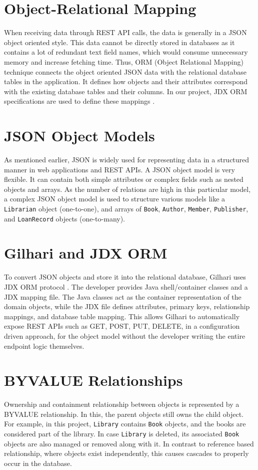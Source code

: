 \documentclass{book}
\begin{document}
\section{Object-Relational Mapping}
When receiving data through REST API calls, the data is generally in a JSON object oriented style. This data cannot be directly stored in databases as it contains a lot of redundant text field names, which would consume unnecessary memory and increase fetching time. Thus, ORM (Object Relational Mapping) technique connects the object oriented JSON data with the relational database tables in the application. It defines how objects and their attributes correspond with the existing database tables and their columns. In our project, JDX ORM specifications are used to define these mappings \cite{jdx}.
\section{JSON Object Models}
As mentioned earlier, JSON is widely used for representing data in a structured manner in web applications and REST APIs. A JSON object model is very flexible. It can contain both simple attributes or complex fields such as nested objects and arrays. As the number of relations are high in this particular model, a complex JSON object model is used to structure various models like a \texttt{Librarian} object (one-to-one), and arrays of \texttt{Book}, \texttt{Author}, \texttt{Member}, \texttt{Publisher}, and \texttt{LoanRecord} objects (one-to-many).

\section{Gilhari and JDX ORM}
To convert JSON objects and store it into the relational database, Gilhari uses JDX ORM protocol \cite{gilhari}. The developer provides Java shell/container classes and a JDX mapping file. The Java classes act as the container representation of the domain objects, while the JDX file defines attributes, primary keys, relationship mappings, and database table mapping. This allows Gilhari to automatically expose REST APIs such as GET, POST, PUT, DELETE, in a configuration driven approach, for the object model without the developer writing the entire endpoint logic themselves.
\section{BYVALUE Relationships}
Ownership and containment relationship between objects is represented by a BYVALUE relationship. In this, the parent objects still owns the child object. For example, in this project, \texttt{Library} contains \texttt{Book} objects, and the books are considered part of the library. In case \texttt{Library} is deleted, its associated \texttt{Book} objects are also managed or removed along with it. In contrast to reference based relationship, where objects exist independently, this causes cascades to properly occur in the database.
\end{document}
